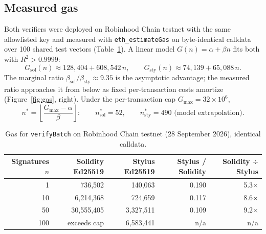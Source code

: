 \documentclass[10.5pt,letterpaper]{article}
\theoremstyle{definition}
\theoremstyle{remark}
\newcommand{\ttt}[1]{\texttt{#1}}
\begin{document}
\subsection{Measured gas}
Both verifiers were deployed on Robinhood Chain testnet with the same allowlisted key and measured with
\ttt{eth\_estimateGas} on byte-identical calldata over 100 shared test vectors (Table~\ref{tab:gas}). A linear model
$G(n)=\alpha+\beta n$ fits both with $R^2>0.9999$:
\begin{equation}\label{eq:gas}
G_{\mathrm{sol}}(n) \approx 128{,}404 + 608{,}542\,n,\qquad
G_{\mathrm{sty}}(n) \approx 74{,}139 + 65{,}088\,n .
\end{equation}
The marginal ratio $\beta_{\mathrm{sol}}/\beta_{\mathrm{sty}}\approx 9.35$ is the asymptotic advantage; the measured ratio approaches it from below
as fixed per-transaction costs amortize (Figure~\ref{fig:gas}, right). Under the per-transaction cap $G_{\max}=32\times10^6$,
\begin{equation}\label{eq:nmax}
n^{*} = \left\lfloor \frac{G_{\max}-\alpha}{\beta} \right\rfloor :\qquad n^{*}_{\mathrm{sol}} = 52,\qquad n^{*}_{\mathrm{sty}} = 490 \text{ (model extrapolation)}.
\end{equation}

\begin{table}[!htb]
\centering\small
\caption{Gas for \ttt{verifyBatch} on Robinhood Chain testnet (28 September 2026), identical calldata.}
\label{tab:gas}
\begin{tabular}{@{}rrrrr@{}}
\toprule
Signatures $n$ & Solidity Ed25519 & Stylus Ed25519 & Stylus / Solidity & Solidity $\div$ Stylus\\
\midrule
1   & 736{,}502    & 140{,}063   & 0.190 & 5.3$\times$\\
10  & 6{,}214{,}368  & 724{,}659   & 0.117 & 8.6$\times$\\
50  & 30{,}555{,}405 & 3{,}327{,}511 & 0.109 & 9.2$\times$\\
100 & exceeds cap  & 6{,}583{,}441 & n/a & n/a\\
\bottomrule
\end{tabular}
\end{table}
\end{document}
